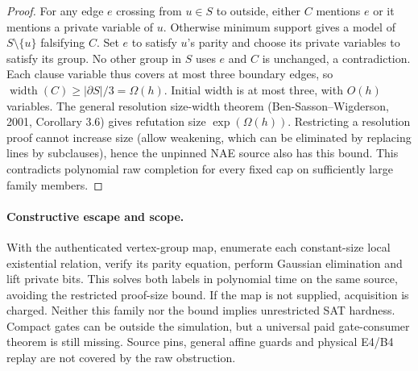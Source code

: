 \documentclass[11pt]{article}
\begin{document}
\begin{proof}
For any edge $e$ crossing from $u\in S$ to outside, either $C$ mentions $e$ or it mentions a private variable of $u$. Otherwise minimum support gives a model of $S\setminus\{u\}$ falsifying $C$. Set $e$ to satisfy $u$'s parity and choose its private variables to satisfy its group. No other group in $S$ uses $e$ and $C$ is unchanged, a contradiction. Each clause variable thus covers at most three boundary edges, so $\operatorname{width}(C)\ge|\partial S|/3=\Omega(h)$. Initial width is at most three, with $O(h)$ variables. The general resolution size-width theorem (Ben-Sasson--Wigderson, 2001, Corollary 3.6) gives refutation size $\exp(\Omega(h))$. Restricting a resolution proof cannot increase size (allow weakening, which can be eliminated by replacing lines by subclauses), hence the unpinned NAE source also has this bound. This contradicts polynomial raw completion for every fixed cap on sufficiently large family members.
\end{proof}
\paragraph{Constructive escape and scope.}
With the authenticated vertex-group map, enumerate each constant-size local existential relation, verify its parity equation, perform Gaussian elimination and lift private bits. This solves both labels in polynomial time on the same source, avoiding the restricted proof-size bound. If the map is not supplied, acquisition is charged. Neither this family nor the bound implies unrestricted SAT hardness. Compact gates can be outside the simulation, but a universal paid gate-consumer theorem is still missing. Source pins, general affine guards and physical E4/B4 replay are not covered by the raw obstruction.
 
\end{document}
